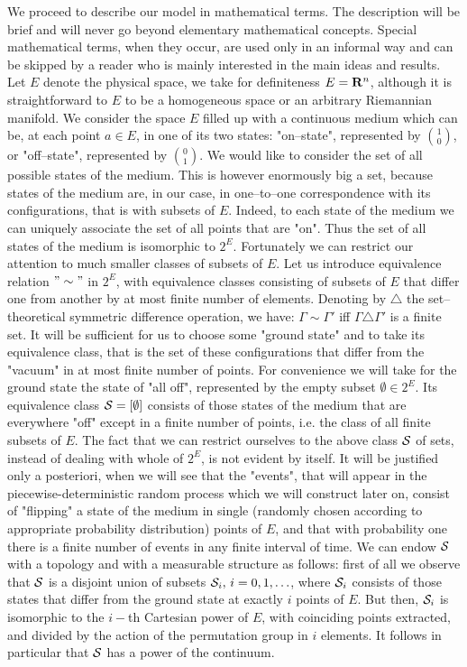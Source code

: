 \documentclass[12pt]{article}
\begin{document}
We proceed to describe our model in mathematical terms. The description
will be brief and will never go beyond elementary mathematical concepts.
Special mathematical terms, when they occur, are used only in an informal
way and can be skipped by a reader who is mainly interested in the main
ideas and results.\\ Let $E$ denote the physical space, we take for
definiteness $E={\bf R}^n$, although it is straightforward to $E$ to be a
homogeneous space or an arbitrary Riemannian manifold. We consider the
space $E$ filled up with a continuous medium which can be, at each point
$a\in E$, in one of its two states: "on--state", represented by
${1\choose0}$, or "off--state", represented by ${0\choose1}$. We would like
to consider the set of all possible states of the medium. This is however
enormously big a set, because states of the medium are, in our case, in
one--to--one correspondence with its configurations, that is with subsets
of $E$. Indeed, to each state of the medium we can uniquely associate the
set of all points that are "on". Thus the set of all states of the medium
is isomorphic to $2^E$. Fortunately we can restrict our attention to much
smaller classes of subsets of $E$. Let us introduce equivalence relation
$"\sim "$ in $2^E$, with equivalence classes consisting of subsets of $E$
that differ one from another by at most finite number of elements. Denoting
by ${\scriptstyle\triangle}$ the set--theoretical symmetric difference
operation, we have: $\Gamma\sim \Gamma '$ iff
$\Gamma{\scriptstyle\triangle} \Gamma '$ is a finite set. It will be
sufficient for us to choose some "ground state" and to take its equivalence
class, that is the set of these configurations that differ from the
"vacuum" in at most finite number of points. For convenience we will take
for the ground state the state of "all off", represented by the empty
subset $\emptyset \in 2^E$. Its equivalence class ${\cal S} = [ \emptyset
]$ consists of those states of the medium that are everywhere "off" except
in a finite number of points, i.e. the class of all {\sl } finite subsets
of $E$.
\vskip10pt
The fact that we can restrict ourselves to the above class ${\cal S}$ of
sets, instead of dealing with whole of $2^E$, is not evident by itself. It
will be justified only a posteriori, when we will see that the "events",
that will appear in the piecewise-deterministic random process which we
will construct later on, consist of "flipping" a state of the medium in
single (randomly chosen according to appropriate probability distribution)
points of $E$, and that with probability one there is a finite number of
events in any finite interval of time.
\vskip10pt
We can endow ${\cal S}$ with a topology and with a measurable structure as
follows: first of all we observe that ${\cal S}$ is a disjoint union of
subsets ${\cal S}_i , \, i=0,1,\ldots $, where ${\cal S}_i$ consists of
those states that differ from the ground state at exactly $i$ points of
$E$. But then, ${\cal S}_i$ is isomorphic to the $i-$th Cartesian power of
$E$, with coinciding points extracted, and divided by the action of the
permutation group in $i$ elements. It follows in particular that ${\cal S}$
has a power of the continuum.
\end{document}
